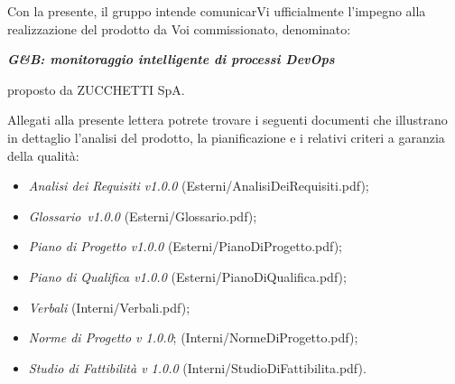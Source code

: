 \documentclass[12pt]{newlfm}
\begin{document}
	\begin{newlfm}
		Con la presente, il gruppo \GroupName intende comunicarVi ufficialmente l'impegno alla realizzazione del prodotto da Voi commissionato, denominato:
		\begin{center}
			\textbf{\textit{G\&B: monitoraggio intelligente di processi DevOps}}
		\end{center}
		proposto da ZUCCHETTI SpA.
		
		Allegati alla presente lettera potrete trovare i seguenti documenti che illustrano in dettaglio l'analisi del prodotto, la pianificazione e i relativi criteri a garanzia della qualità:
		
		\begin{itemize}
			\item \textit{Analisi dei Requisiti v1.0.0} (Esterni/AnalisiDeiRequisiti.pdf);
			\item \textit{Glossario\ v1.0.0} (Esterni/Glossario.pdf);
			\item \textit{Piano di Progetto v1.0.0} (Esterni/PianoDiProgetto.pdf);
			\item \textit{Piano di Qualifica v1.0.0} (Esterni/PianoDiQualifica.pdf);
			\item \textit{Verbali} (Interni/Verbali.pdf);
			\item \textit{Norme di Progetto v 1.0.0}; (Interni/NormeDiProgetto.pdf);
			\item \textit{Studio di Fattibilità v 1.0.0} (Interni/StudioDiFattibilita.pdf).
		\end{itemize}
		

\end{newlfm}
\end{document}
